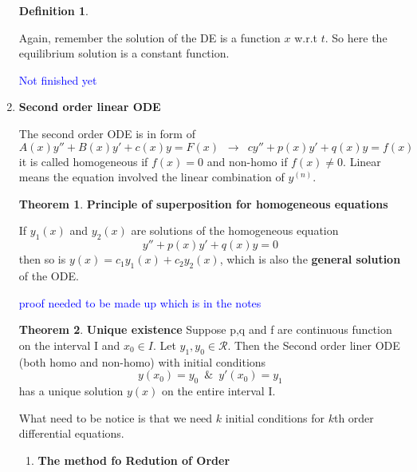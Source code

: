 \documentclass[9pt]{article}
\theoremstyle{definition}
\newtheorem{definition}{Definition}
\newenvironment{changemargin}[2]{%
  \begin{list}{}{%
    \setlength{\topsep}{0pt}%
    \setlength{\leftmargin}{#1}%
    \setlength{\rightmargin}{#2}%
    \setlength{\listparindent}{\parindent}%
    \setlength{\itemindent}{\parindent}%
    \setlength{\parsep}{\parskip}%
  }%
  \item[]}{\end{list}}
\theoremstyle{theorem}
\newtheorem{theorem}{Theorem}
\theoremstyle{remark}
\theoremstyle{lemma}
\begin{document}
\begin{changemargin}{-0.125in}{0in}
\begin{enumerate}
\begin{definition}
       \end{definition}
       Again, remember the solution of the DE is a function $x$ w.r.t $t$. So here the equilibrium solution is a constant function.
       
       \textcolor{blue}{Not finished yet}
       
       \medskip
       
       \item \textbf{Second order linear ODE}
       
       \medskip
       
     
       	 The second order ODE is in form of 
       	 \[
       	 A(x) y'' + B(x)y' + c(x)y = F(x)\,\,\,\longrightarrow \,\,\,cy'' + p(x)y' + q(x)y = f(x)
       	 \]
       	 it is called homogeneous if $f(x) = 0 $ and non-homo if $f(x) \neq 0$. Linear means the equation involved the linear combination of $y^{(n)}$.
      
      \begin{theorem}{\textbf{Principle of superposition for homogeneous equations}}
      
      If $y_1(x)$ and $y_2(x)$ are solutions of the homogeneous equation
      \[
      y'' + p(x)y' + q(x)y = 0
      \]
      then so is $y(x) = c_1y_1(x)  + c_2 y_2(x)$, which is also the \textbf{general solution} of the ODE.
      \end{theorem}
      
      \textcolor{blue}{proof needed to be made up which is in the notes}
      
      \medskip
      
      \begin{theorem}
      	{\textbf{Unique existence}}
      	Suppose p,q and f are continuous function on the interval I and $x_0 \in I$. Let $y_1,y_0 \in \mathcal{R}$. Then the Second order liner ODE (both homo and non-homo) with initial conditions 
      	\[
      	y(x_0) = y_0\,\,\,\&\,\,\,y'(x_0) = y_1
      	\]
      	has a unique solution $y(x)$ on the entire interval I.
      \end{theorem}
      What need to be notice is that we need $k$ initial conditions for $k$th order differential equations.
      
      \medskip
      
      \begin{enumerate}
      
      \item \textbf{The method fo Redution of Order} 
      

\end{enumerate}
\end{enumerate}
\end{changemargin}
\end{document}
